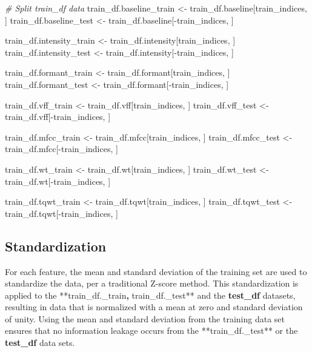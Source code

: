 \documentclass[
]{article}
\newenvironment{Shaded}{\begin{snugshade}}{\end{snugshade}}
\newcommand{\CommentTok}[1]{\textcolor[rgb]{0.56,0.35,0.01}{\textit{#1}}}
\newcommand{\NormalTok}[1]{#1}
\newcommand{\OtherTok}[1]{\textcolor[rgb]{0.56,0.35,0.01}{#1}}
\newcommand{\SpecialCharTok}[1]{\textcolor[rgb]{0.00,0.00,0.00}{#1}}
\begin{document}
\begin{Shaded}
\begin{Highlighting}[]
\CommentTok{\# Split train\_df data}
\NormalTok{train\_df.baseline\_train }\OtherTok{\textless{}{-}}\NormalTok{ train\_df.baseline[train\_indices, ]}
\NormalTok{train\_df.baseline\_test }\OtherTok{\textless{}{-}}\NormalTok{ train\_df.baseline[}\SpecialCharTok{{-}}\NormalTok{train\_indices, ]}

\NormalTok{train\_df.intensity\_train }\OtherTok{\textless{}{-}}\NormalTok{ train\_df.intensity[train\_indices, ]}
\NormalTok{train\_df.intensity\_test }\OtherTok{\textless{}{-}}\NormalTok{ train\_df.intensity[}\SpecialCharTok{{-}}\NormalTok{train\_indices, ]}

\NormalTok{train\_df.formant\_train }\OtherTok{\textless{}{-}}\NormalTok{ train\_df.formant[train\_indices, ]}
\NormalTok{train\_df.formant\_test }\OtherTok{\textless{}{-}}\NormalTok{ train\_df.formant[}\SpecialCharTok{{-}}\NormalTok{train\_indices, ]}

\NormalTok{train\_df.vff\_train }\OtherTok{\textless{}{-}}\NormalTok{ train\_df.vff[train\_indices, ]}
\NormalTok{train\_df.vff\_test }\OtherTok{\textless{}{-}}\NormalTok{ train\_df.vff[}\SpecialCharTok{{-}}\NormalTok{train\_indices, ]}

\NormalTok{train\_df.mfcc\_train }\OtherTok{\textless{}{-}}\NormalTok{ train\_df.mfcc[train\_indices, ]}
\NormalTok{train\_df.mfcc\_test }\OtherTok{\textless{}{-}}\NormalTok{ train\_df.mfcc[}\SpecialCharTok{{-}}\NormalTok{train\_indices, ]}

\NormalTok{train\_df.wt\_train }\OtherTok{\textless{}{-}}\NormalTok{ train\_df.wt[train\_indices, ]}
\NormalTok{train\_df.wt\_test }\OtherTok{\textless{}{-}}\NormalTok{ train\_df.wt[}\SpecialCharTok{{-}}\NormalTok{train\_indices, ]}

\NormalTok{train\_df.tqwt\_train }\OtherTok{\textless{}{-}}\NormalTok{ train\_df.tqwt[train\_indices, ]}
\NormalTok{train\_df.tqwt\_test }\OtherTok{\textless{}{-}}\NormalTok{ train\_df.tqwt[}\SpecialCharTok{{-}}\NormalTok{train\_indices, ]}
\end{Highlighting}
\end{Shaded}

\newpage

\hypertarget{standardization}{%
\subsection{Standardization}\label{standardization}}

For each feature, the mean and standard deviation of the training set are used to standardize the data, per a traditional Z-score method. This standardization is applied to the **train\_df.\_train\textbf{, }train\_df.\_test** and the \textbf{test\_df} datasets, resulting in data that is normalized with a mean at zero and standard deviation of unity. Using the mean and standard deviation from the training data set ensures that no information leakage occurs from the **train\_df.\_test** or the \textbf{test\_df} data sets.
\end{document}
